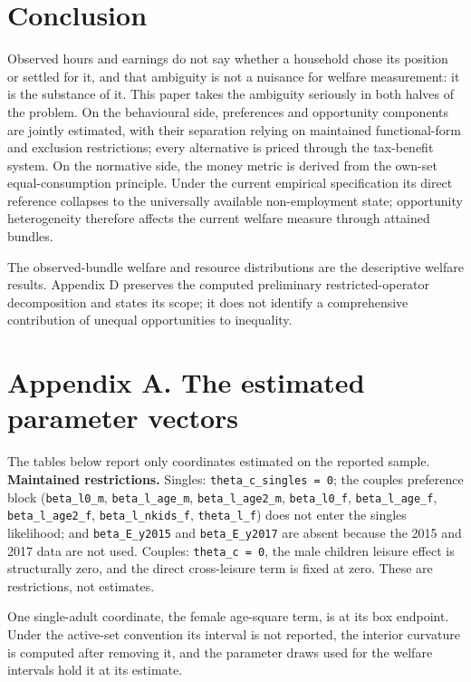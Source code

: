 \documentclass[11pt,a4paper]{article}
\begin{document}
\section{Conclusion}\label{conclusion}

Observed hours and earnings do not say whether a household chose its position or settled for it, and that ambiguity is not a nuisance for welfare measurement: it is the substance of it. This paper takes the ambiguity seriously in both halves of the problem. On the behavioural side, preferences and opportunity components are jointly estimated, with their separation relying on maintained functional-form and exclusion restrictions; every alternative is priced through the tax-benefit system. On the normative side, the money metric is derived from the own-set equal-consumption principle. Under the current empirical specification its direct reference collapses to the universally available non-employment state; opportunity heterogeneity therefore affects the current welfare measure through attained bundles.

The observed-bundle welfare and resource distributions are the descriptive welfare results. Appendix D preserves the computed preliminary restricted-operator decomposition and states its scope; it does not identify a comprehensive contribution of unequal opportunities to inequality.

\appendix

\section{Appendix A. The estimated parameter vectors}\label{appendix-a.-the-estimated-parameter-vectors}

The tables below report only coordinates estimated on the reported sample. \textbf{Maintained restrictions.} Singles: \texttt{theta\_c\_singles\ =\ 0}; the couples preference block (\texttt{beta\_l0\_m}, \texttt{beta\_l\_age\_m}, \texttt{beta\_l\_age2\_m}, \texttt{beta\_l0\_f}, \texttt{beta\_l\_age\_f}, \texttt{beta\_l\_age2\_f}, \texttt{beta\_l\_nkids\_f}, \texttt{theta\_l\_f}) does not enter the singles likelihood; and \texttt{beta\_E\_y2015} and \texttt{beta\_E\_y2017} are absent because the 2015 and 2017 data are not used. Couples: \texttt{theta\_c\ =\ 0}, the male children leisure effect is structurally zero, and the direct cross-leisure term is fixed at zero. These are restrictions, not estimates.

One single-adult coordinate, the female age-square term, is at its box endpoint. Under the active-set convention its interval is not reported, the interior curvature is computed after removing it, and the parameter draws used for the welfare intervals hold it at its estimate.
\end{document}
